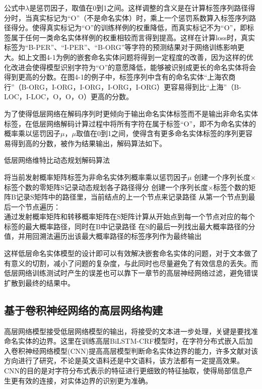 \documentclass[winfonts,master,oneside,nobackinfo]{njuthesis}
\begin{document}
公式中$\lambda$是惩罚因子，取值在0到1之间。这样调整的含义是在计算标签序列路径得分时，当真实标记为“O”（不是命名实体）时，乘上一个惩罚系数算入标签序列路径得分。使得真实标记为“O”的训练样例的权重降低，而真实标记不为“O”，即标签属于任何一类命名实体样例的权重相较而言得到提高。这样在计算loss时，真实标签为“B-PER”、“I-PER”、“B-ORG”等字符的预测结果对于网络训练影响更大。如上文图4-1为例的嵌套命名实体问题将得到一定程度的改善，因为这样的优化改进会使得模型识别字符为“O”的意愿降低，能够被识别成更长的命名实体将会得到更高的分数。在图4-1的例子中，标签序列中含有的命名实体“上海农商行”（B-ORG，I-ORG，I-ORG，I-ORG，I-ORG）更容易得到比“上海”（B-LOC，I-LOC，O，O，O）更高的分数。

为了使得低层网络在解码序列时更倾向于输出命名实体标签而不是输出非命名实体标签，在低层网络解码计算过程中将所有字符在属于标签“O”，即不为命名实体的概率乘以惩罚因子$\mu$，$\mu$取值在0到1之间，使得含有更多命名实体标签的序列更容易得到高的分数，被作为结果输出，解码算法如下。

\begin{algorithm}[H]
    \caption{低层网络维特比动态规划解码算法}
    \label{alg1}
    \begin{algorithmic}[1]
		\STATE 将当前发射概率矩阵标签为非命名实体列概率乘以惩罚因子$\mu$
        \STATE 创建一个序列长度×标签个数的零矩阵S记录动态规划各子路径得分
        \STATE 创建一个序列长度×标签个数的矩阵B记录S矩阵中的路径里，当前结点的上一个节点来记录路径
        \STATE 从第一个节点到最后一个节点遍历： \\
		通过发射概率矩阵和转移概率矩阵在S矩阵计算从开始点到每一个节点对应的每个标签的最大概率路径，同时在B中记录路径
		\STATE 在S的最后一列找出最大概率路径的分值，并用回溯法遍历出该最大概率路径的标签序列作为最终输出
    \end{algorithmic}
\end{algorithm}

这样低层命名实体模型的设计即可以有效解决嵌套命名实体的问题，对于文本做了有意义的切割，减小了问题的复杂度，与此同时也尽量避免了有效信息的丢失。而低层网络训练测试时产生的误差也可以靠下一章节的高层神经网络过滤，避免错误扩散到最终的结果中。

\subsection{基于卷积神经网络的高层网络构建}

高层网络模型接受低层网络模型的输出，将接受的文本进一步处理，关键是要找准命名实体的边界。这里在训练高层BiLSTM-CRF模型时，在字符分布式嵌入后加入卷积神经网络模型(CNN)提高高层模型判断命名实体边界的能力\cite{Ma}\cite{kang}，许多文献对该方向进行了研究，不论是英文语料\cite{Zenan}还是中文语料\cite{Yaozong}，该方法都有一定提高效果。CNN的目的是对字符分布式表示的特征进行更细致的特征抽取，使得局部信息产生更有效的连接，对实体边界的识别更为准确。
\end{document}
